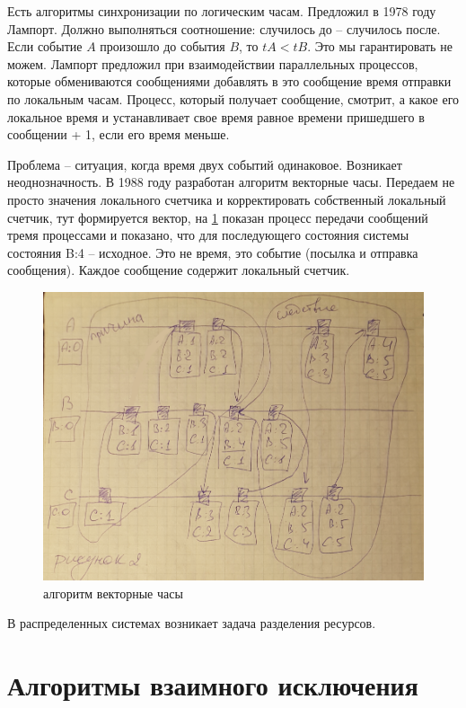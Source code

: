 Есть алгоритмы синхронизации по логическим часам. Предложил в 1978 году Лампорт. Должно выполняться соотношение: случилось до – случилось после. Если событие $A$ произошло до события $B$, то $tA < tB$. Это мы гарантировать не можем. Лампорт предложил при взаимодействии параллельных процессов, которые обмениваются сообщениями добавлять в это сообщение время отправки по локальным часам. Процесс, который получает сообщение, смотрит, а какое его локальное время и устанавливает свое время равное времени пришедшего в сообщении + 1, если его время меньше.

Проблема – ситуация, когда время двух событий одинаковое. Возникает неоднозначность.
В 1988 году разработан алгоритм векторные часы. Передаем не просто значения локального счетчика и корректировать собственный локальный счетчик, тут формируется вектор, на \ref{pic:vec_watch} показан процесс передачи сообщений тремя процессами и показано, что для последующего состояния системы состояния B:4 – исходное. Это не время, это событие (посылка и отправка сообщения). Каждое сообщение содержит локальный счетчик.

\begin{figure}[H]
    \centering
    \includegraphics[width=\textwidth]{pic/2.png}
    \caption{алгоритм векторные часы}
    \label{pic:vec_watch}
\end{figure}

В распределенных системах возникает задача разделения ресурсов.

\section{Алгоритмы взаимного исключения}

